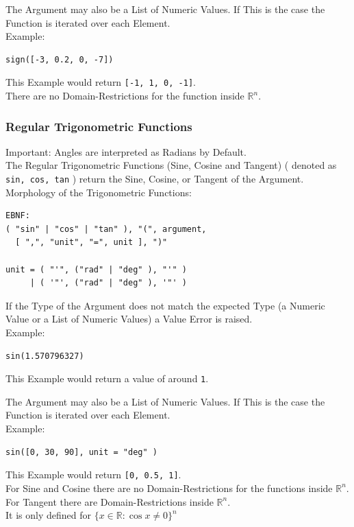 \documentclass{report}
\begin{document}
The Argument may also be a List of Numeric Values. If This is the case the Function is iterated over each Element.\\
Example:
\begin{verbatim}
sign([-3, 0.2, 0, -7])
\end{verbatim}
This Example would return \texttt{[-1, 1, 0, -1]}.\\
There are no Domain-Restrictions for the function inside $\mathbb{R}^n$.


\subsubsection{Regular Trigonometric Functions}
Important: Angles are interpreted as Radians by Default.\\
The Regular Trigonometric Functions (Sine, Cosine and Tangent) ( denoted as \texttt{sin, cos, tan} ) return the Sine, Cosine, or Tangent of the Argument. \\
Morphology of the Trigonometric Functions:
\begin{verbatim}
EBNF:
( "sin" | "cos" | "tan" ), "(", argument, 
  [ ",", "unit", "=", unit ], ")"

unit = ( "'", ("rad" | "deg" ), "'" )
     | ( '"', ("rad" | "deg" ), '"' )
\end{verbatim}
If the Type of the Argument does not match the expected Type (a Numeric Value or a List of Numeric Values) a Value Error is raised.\\
Example:
\begin{verbatim}
sin(1.570796327)
\end{verbatim}
This Example would return a value of around \texttt{1}.

The Argument may also be a List of Numeric Values. If This is the case the Function is iterated over each Element.\\
Example:
\begin{verbatim}
sin([0, 30, 90], unit = "deg" )
\end{verbatim}
This Example would return \texttt{[0, 0.5, 1]}.\\
For Sine and Cosine there are no Domain-Restrictions for the functions inside $\mathbb{R}^n$. \\
For Tangent there are Domain-Restrictions inside $\mathbb{R}^n$.\\
It is only defined for $\{x \in \mathbb{R}: \cos x \neq 0 \}^n$
\end{document}
